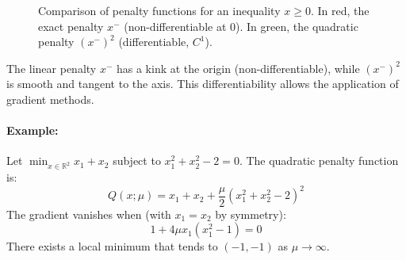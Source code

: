\begin{figure}[H]
\centering
{}
\caption{Comparison of penalty functions for an inequality $x \ge 0$. In red, the exact penalty $x^-$ (non-differentiable at 0). In green, the quadratic penalty $(x^-)^2$ (differentiable, $C^1$).}
\label{fig:penalty-functions-comparison}
\end{figure}

\begin{figureexplanation}
The linear penalty $x^-$ has a kink at the origin (non-differentiable), while $(x^-)^2$ is smooth and tangent to the axis. This differentiability allows the application of gradient methods.
\end{figureexplanation}

\paragraph{Example:}
Let $\min_{x \in \mathbb{R}^2} x_1 + x_2$ subject to $x_1^2 + x_2^2 - 2 = 0$.
The quadratic penalty function is:
\begin{equation}
    Q(x; \mu) = x_1 + x_2 + \frac{\mu}{2} (x_1^2 + x_2^2 - 2)^2
\end{equation}
The gradient vanishes when (with $x_1 = x_2$ by symmetry):
\begin{equation}
    1 + 4\mu x_1 (x_1^2 - 1) = 0
\end{equation}
There exists a local minimum that tends to $(-1, -1)$ as $\mu \to \infty$.

